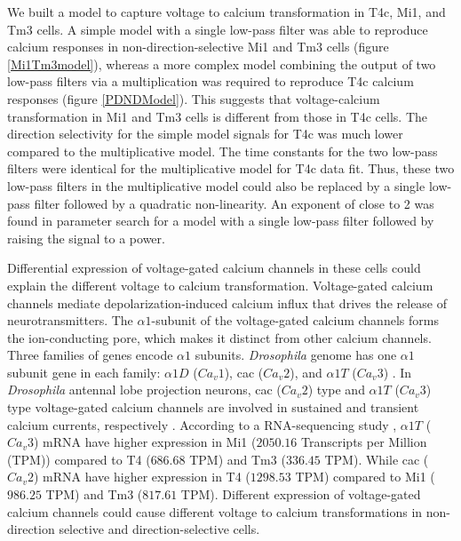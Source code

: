 \documentclass[9pt,lineno]{elife}
\begin{document}
We built a model to capture voltage to calcium transformation in T4c, Mi1, and Tm3 cells. A simple model with a single low-pass filter was able to reproduce calcium responses in non-direction-selective Mi1 and Tm3 cells (figure \ref{Mi1Tm3model}), whereas a more complex model combining the output of two low-pass filters via a multiplication was required to reproduce T4c calcium responses (figure \ref{PDNDModel}). This suggests that voltage-calcium transformation in Mi1 and Tm3 cells is different from those in T4c cells. The direction selectivity for the simple model signals for T4c was much lower compared to the multiplicative model. The time constants for the two low-pass filters were identical for the multiplicative model for T4c data fit. Thus, these two low-pass filters in the multiplicative model could also be replaced by a single low-pass filter followed by a quadratic non-linearity. An exponent of close to 2 was found in parameter search for a model with a single low-pass filter followed by raising the signal to a power.  


Differential expression of voltage-gated calcium channels in these cells could explain the different voltage to calcium transformation. Voltage-gated calcium channels mediate depolarization-induced calcium influx that drives the release of neurotransmitters. The $\alpha1$-subunit of the voltage-gated calcium channels forms the ion-conducting pore, which makes it distinct from other calcium channels. Three families of genes encode $\alpha1$ subunits. \textit{Drosophila} genome has one $\alpha1$ subunit gene in each family: $\alpha1D$ ($Ca_{v}1$), cac ($Ca_{v}2$), and $\alpha1T$ ($Ca_{v}3$) \parencite{Littleton2000, King2007}. In \textit{Drosophila} antennal lobe projection neurons, cac ($Ca_{v}2$) type and $\alpha1T$ ($Ca_{v}3$) type voltage-gated calcium channels are involved in sustained and transient calcium currents, respectively \parencite{Gu2009, Iniguez2013}. According to a RNA-sequencing study \parencite{Davis2020}, $\alpha1T$ ($Ca_{v}3$) mRNA have higher expression in Mi1 ($2050.16$ Transcripts per Million (TPM)) compared to T4 ($686.68$ TPM) and Tm3 ($336.45$ TPM). While cac ($Ca_{v}2$) mRNA have higher expression in T4 ($1298.53$ TPM) compared to Mi1 ($986.25$ TPM) and Tm3 ($817.61$ TPM). Different expression of voltage-gated calcium channels could cause different voltage to calcium transformations in non-direction selective and direction-selective cells.
\end{document}
